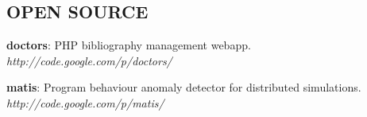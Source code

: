 \documentclass[margin]{res}
\begin{document}
\begin{resume}
\section{OPEN SOURCE}
\begin{list}{}{\leftmargin=0em \topsep=0pt \partopsep=0pt \parsep=2.5pt}
\item {\bf doctors}: PHP bibliography management webapp.  {\em http://code.google.com/p/doctors/}
\item {\bf matis}: Program behaviour anomaly detector for distributed simulations.  \\
  {\em http://code.google.com/p/matis/}
\end{list}




 




\end{resume} 
\end{document}
